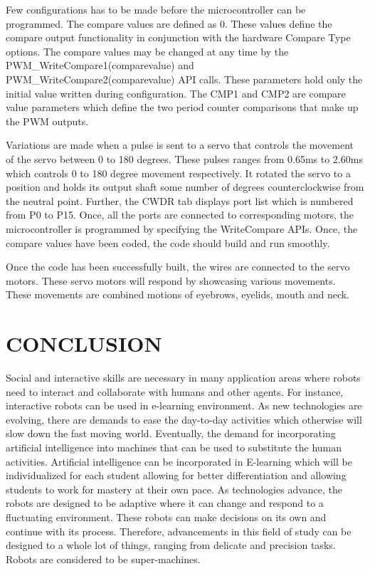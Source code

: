 \documentclass[letterpaper,12pt]{article}
\begin{document}
\begin{multicols}{2}
\par
Few configurations has to be made before the microcontroller can be programmed. The compare values are defined as 0. These values define the compare output functionality in conjunction with the hardware Compare Type options. The compare values may be changed at any time by the PWM\_WriteCompare1(comparevalue) and PWM\_WriteCompare2(comparevalue) API calls. These parameters hold only the initial value written during configuration. The CMP1 and CMP2 are compare value parameters which define the two period counter comparisons that make up the PWM outputs. \\
\par
Variations are made when a pulse is sent to a servo that controls the movement of the servo between 0 to 180 degrees. These pulses ranges from 0.65ms to 2.60ms which controls 0 to 180 degree movement respectively. It rotated the servo to a position and holds its output shaft some number of degrees counterclockwise from the neutral point. Further, the CWDR tab displays port list which is numbered from P0 to P15. Once, all the ports are connected to corresponding motors, the microcontroller is programmed by specifying the WriteCompare APIs. Once, the compare values have been coded, the code should build and run smoothly. \\
\par
Once the code has been successfully built, the wires are connected to the servo motors. These servo motors will respond by showcasing various movements. These movements are combined motions of eyebrows, eyelids, mouth and neck.



\section{CONCLUSION}
Social and interactive skills are necessary in many application areas where robots need to interact and collaborate with humans and other agents. For instance, interactive robots can be used in e-learning environment. As new technologies are evolving, there are demands to ease the day-to-day activities which otherwise will slow down the fast moving world. Eventually, the demand for incorporating artificial intelligence into machines that can be used to substitute the human activities. Artificial intelligence can be incorporated in E-learning which will be individualized for each student allowing for better differentiation and allowing students to work for mastery at their own pace. As technologies advance, the robots are designed to be adaptive where it can change and respond to a fluctuating environment. These robots can make decisions on its own and continue with its process. Therefore, advancements in this field of study can be designed to a whole lot of things, ranging from delicate and precision tasks. Robots are considered to be super-machines.

\end{multicols}
\end{document}
